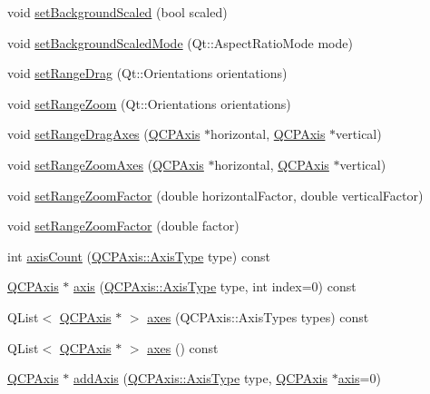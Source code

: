 \begin{DoxyCompactItemize}
\item 
void \hyperlink{class_q_c_p_axis_rect_ae6d36c3e0e968ffb991170a018e7b503}{set\+Background\+Scaled} (bool scaled)
\item 
void \hyperlink{class_q_c_p_axis_rect_a5ef77ea829c9de7ba248e473f48f7305}{set\+Background\+Scaled\+Mode} (Qt\+::\+Aspect\+Ratio\+Mode mode)
\item 
void \hyperlink{class_q_c_p_axis_rect_ae6aef2f7211ba6097c925dcd26008418}{set\+Range\+Drag} (Qt\+::\+Orientations orientations)
\item 
void \hyperlink{class_q_c_p_axis_rect_a7960a9d222f1c31d558b064b60f86a31}{set\+Range\+Zoom} (Qt\+::\+Orientations orientations)
\item 
void \hyperlink{class_q_c_p_axis_rect_a648cce336bd99daac4a5ca3e5743775d}{set\+Range\+Drag\+Axes} (\hyperlink{class_q_c_p_axis}{Q\+C\+P\+Axis} $\ast$horizontal, \hyperlink{class_q_c_p_axis}{Q\+C\+P\+Axis} $\ast$vertical)
\item 
void \hyperlink{class_q_c_p_axis_rect_a9442cca2aa358405f39a64d51eca13d2}{set\+Range\+Zoom\+Axes} (\hyperlink{class_q_c_p_axis}{Q\+C\+P\+Axis} $\ast$horizontal, \hyperlink{class_q_c_p_axis}{Q\+C\+P\+Axis} $\ast$vertical)
\item 
void \hyperlink{class_q_c_p_axis_rect_a895d7ac745ea614e04056244b3c138ac}{set\+Range\+Zoom\+Factor} (double horizontal\+Factor, double vertical\+Factor)
\item 
void \hyperlink{class_q_c_p_axis_rect_ae83d187b03fc6fa4f00765ad50cd3fc3}{set\+Range\+Zoom\+Factor} (double factor)
\item 
int \hyperlink{class_q_c_p_axis_rect_a16e3e4646e52e4b5d5b865076c29ae58}{axis\+Count} (\hyperlink{class_q_c_p_axis_ae2bcc1728b382f10f064612b368bc18a}{Q\+C\+P\+Axis\+::\+Axis\+Type} type) const 
\item 
\hyperlink{class_q_c_p_axis}{Q\+C\+P\+Axis} $\ast$ \hyperlink{class_q_c_p_axis_rect_a560de44e47a4af0f86c59102a094b1e4}{axis} (\hyperlink{class_q_c_p_axis_ae2bcc1728b382f10f064612b368bc18a}{Q\+C\+P\+Axis\+::\+Axis\+Type} type, int index=0) const 
\item 
Q\+List$<$ \hyperlink{class_q_c_p_axis}{Q\+C\+P\+Axis} $\ast$ $>$ \hyperlink{class_q_c_p_axis_rect_a66654d51ca611ef036ded36250cd2518}{axes} (Q\+C\+P\+Axis\+::\+Axis\+Types types) const 
\item 
Q\+List$<$ \hyperlink{class_q_c_p_axis}{Q\+C\+P\+Axis} $\ast$ $>$ \hyperlink{class_q_c_p_axis_rect_a18dcdc0dd6c7520bc9f3d15a7a3feec2}{axes} () const 
\item 
\hyperlink{class_q_c_p_axis}{Q\+C\+P\+Axis} $\ast$ \hyperlink{class_q_c_p_axis_rect_a2dc336092ccc57d44a46194c8a23e4f4}{add\+Axis} (\hyperlink{class_q_c_p_axis_ae2bcc1728b382f10f064612b368bc18a}{Q\+C\+P\+Axis\+::\+Axis\+Type} type, \hyperlink{class_q_c_p_axis}{Q\+C\+P\+Axis} $\ast$\hyperlink{class_q_c_p_axis_rect_a560de44e47a4af0f86c59102a094b1e4}{axis}=0)

\end{DoxyCompactItemize}
